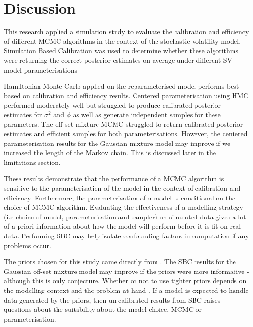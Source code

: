 \documentclass[12pt, a4paper]{article}
\begin{document}
\section{Discussion}
This research applied a simulation study to evaluate the calibration and efficiency of different MCMC algorithms in the context of the stochastic volatility model. Simulation Based Calibration was used to determine whether these algorithms were returning the correct posterior estimates on average under different SV model parameterisations. 

Hamiltonian Monte Carlo applied on the reparameterised model performs best based on calibration and efficiency results. Centered parameterisation using HMC performed moderately well but struggled to produce calibrated posterior estimates for $\sigma^2$ and $\phi$ as well as generate independent samples for these parameters. The off-set mixture MCMC struggled to return calibrated posterior estimates and efficient samples for both parameterisations. However, the centered parameterisation results for the Gaussian mixture model may improve if we increased the length of the Markov chain. This is discussed later in the limitations section. 

These results demonstrate that the performance of a MCMC algorithm is sensitive to the parameterisation of the model in the context of calibration and efficiency. Furthermore, the parameterisation of a model is conditional on the choice of MCMC algorithm. Evaluating the effectiveness of a modelling strategy (i.e choice of model, parameterisation and sampler) on simulated data gives a lot of a priori information about how the model will perform before it is fit on real data. Performing SBC may help isolate confounding factors in computation if any problems occur. 

The priors chosen for this study came directly from \citet{kim1998stochastic}. The SBC results for the Gaussian off-set mixture model may improve if the priors were more informative - although this is only conjecture. Whether or not to use tighter priors depends on the modelling context and the problem at hand \citep{gelman2017prior}. If a model is expected to handle data generated by the priors, then un-calibrated results from SBC raises questions about the suitability about the model choice, MCMC or parameterisation. 
\end{document}
